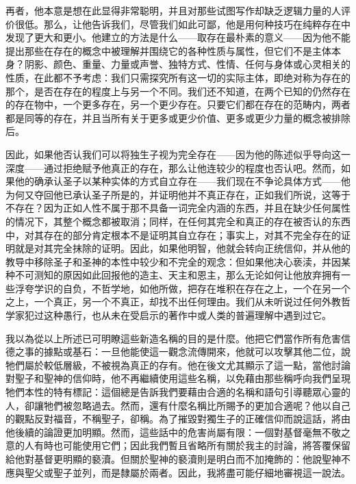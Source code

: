 再者，他本意是想在此显得非常聪明，并且对那些试图写作却缺乏逻辑力量的人评价很低。那么，让他告诉我们，尽管我们如此可鄙，他是用何种技巧在纯粹存在中发现了更大和更小。他建立的方法是什么——取存在最朴素的意义——因为他不能提出那些在存在的概念中被理解并围绕它的各种性质与属性，但它们不是主体本身？阴影、颜色、重量、力量或声誉、独特方式、性情、任何与身体或心灵相关的性质，在此都不予考虑：我们只需探究所有这一切的实际主体，即绝对称为存在的那个，是否在存在的程度上与另一个不同。我们还不知道，在两个已知的仍然存在的存在物中，一个更多存在，另一个更少存在。只要它们都在存在的范畴内，两者都是同等的存在，并且当所有关于更多或更少价值、更多或更少力量的概念被排除后。\par

因此，如果他否认我们可以将独生子视为完全存在——因为他的陈述似乎导向这一深度——通过拒绝赋予他真正的存在，那么让他连较少的程度也否认吧。然而，如果他的确承认圣子以某种实体的方式自立存在——我们现在不争论具体方式——他为何又夺回他已承认圣子所是的，并证明他并不真正存在，正如我们所说，这等于不存在？因为正如人性不属于那不具备一词完全内涵的东西，并且在缺少任何属性的情况下，其整个概念都被取消；同样，在任何其完全和真正的存在被否认的东西中，对其存在的部分肯定根本不是证明其自立存在；事实上，对其不完全存在的证明就是对其完全抹除的证明。因此，如果他明智，他就会转向正统信仰，并从他的教导中移除圣子和圣神的本性中较少和不完全的观念：但如果他决心亵渎，并因某种不可测知的原因如此回报他的造主、天主和恩主，那么无论如何让他放弃拥有一些浮夸学识的自负，不哲学地，如他所做，把存在堆积在存在之上，一个在另一个之上，一个真正，另一个不真正，却找不出任何理由。我们从未听说过任何外教哲学家犯过这种愚行，也从未在受启示的著作中或人类的普遍理解中遇到过它。\par

我以為從以上所述已可明瞭這些新造名稱的目的是什麼。他把它們當作所有危害信德之事的據點或基石：一旦他能使這一觀念流傳開來，他就可以攻擊其他二位，說牠們屬於較低層級，不被視為真正的存有。他在後文尤其顯示了這一點，當他討論對聖子和聖神的信仰時，他不再繼續使用這些名稱，以免藉由那些稱呼向我們呈現牠們本性的特有標記：這個總是告訴我們要藉由合適的名稱和語句引導聽眾心靈的人，卻讓牠們被忽略過去。然而，還有什麼名稱比所賜予的更加合適呢？他以自己的觀點反對福音，不稱聖子，卻稱。為了摧毀對獨生子的正確信仰而說這話，將由他後續的論證更加明顯。然而，這些話中的危害尚屬有限：一個對基督毫無不敬之意的人有時也可能使用它們；因此我們暫且省略所有關於我主的討論，將答覆保留給他對基督更明顯的褻瀆。但關於聖神的褻瀆則是明白而不加掩飾的：他說聖神不應與聖父或聖子並列，而是隸屬於兩者。因此，我將盡可能仔細地審視這一說法。\par

